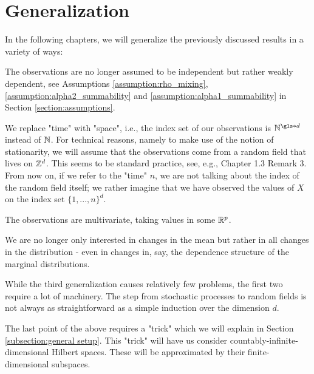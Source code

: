 \section{Generalization}

\label{section:onedim:generalization}

In the following chapters, we will generalize the previously discussed results in a variety of ways: 
\begin{aufzi}
    \item The observations are no longer assumed to be independent but rather weakly dependent, see Assumptions \ref{assumption:rho_mixing}, \ref{assumption:alpha2_summability} and \ref{assumption:alpha1_summability} in Section \ref{section:assumptions}.
    \item We replace "time" with "space", i.e., the index set of our observations is $\NN^{\gls*{d}}$ instead of $\mathbb{N}$. For technical reasons, namely to make use of the notion of stationarity, we will assume that the observations come from a random field that lives on $\mathbb{Z}^d$. This seems to be standard practice, see, e.g., \cite{brockwell1991time} Chapter 1.3 Remark 3. From now on, if we refer to the "time" $n$, we are not talking about the index of the random field itself; we rather imagine that we have observed the values of $X$ on the index set $\{1, ..., n\}^d$.
    \item The observations are multivariate, taking values in some $\mathbb{R}^p$.
    \item We are no longer only interested in changes in the mean but rather in all changes in the distribution - even in changes in, say, the dependence structure of the marginal distributions.
\end{aufzi}
While the third generalization causes relatively few problems, the first two require a lot of machinery. The step from stochastic processes to random fields is not always as straightforward as a simple induction over the dimension $d$.

The last point of the above requires a "trick" which we will explain in Section \ref{subsection:general setup}. This "trick" will have us consider countably-infinite-dimensional Hilbert spaces. These will be approximated by their finite-dimensional subspaces.
